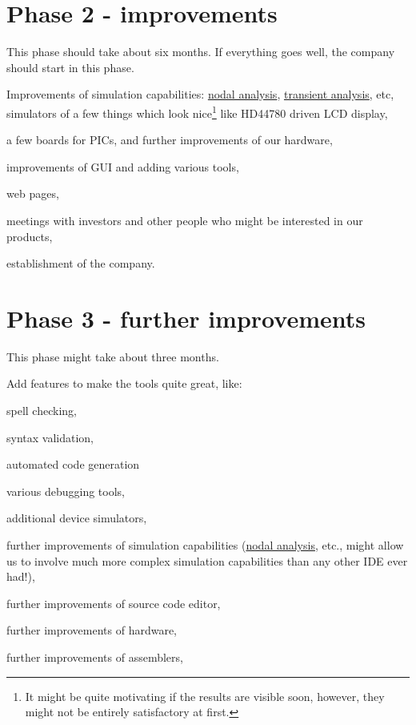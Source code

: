 \documentclass[a4paper,twoside,15pt]{book}
\begin{document}
	\section{Phase 2 - improvements}
		This phase should take about six months. If everything goes well, the company should start in this phase.
		\begin{dinglist}{73}
			\item Improvements of simulation capabilities: \href{http://www.ecircuitcenter.com/SpiceTopics/Nodal Analysis/Nodal Analysis.htm}{nodal analysis}, \href{http://www.ecircuitcenter.com/SpiceTopics/Transient Analysis/Transient Analysis.htm}{transient analysis}, etc, simulators of a few things which look nice\footnote{It might be quite motivating if the results are visible soon, however, they might not be entirely satisfactory at first.} like HD44780 driven LCD display,
			\item a few boards for PICs, and further improvements of our hardware,
			\item improvements of GUI and adding various tools,
			\item web pages,
			\item meetings with investors and other people who might be interested in our products,
			\item establishment of the company.
		\end{dinglist}

	\section{Phase 3 - further improvements}
		This phase might take about three months.
		\begin{dinglist}{73}
			\item Add features to make the tools quite great, like:
				\begin{dinglist}{75}
					\item spell checking,
					\item syntax validation,
					\item automated code generation
					\item various debugging tools,
					\item additional device simulators,
					\item further improvements of simulation capabilities (\href{http://en.wikipedia.org/wiki/Nodal_analysis}{nodal analysis}, etc., might allow us to involve much more complex simulation capabilities than any other IDE ever had!),
					\item further improvements of source code editor,
					\item further improvements of hardware,
					\item further improvements of assemblers,
				\end{dinglist}
		\end{dinglist}
\end{document}
